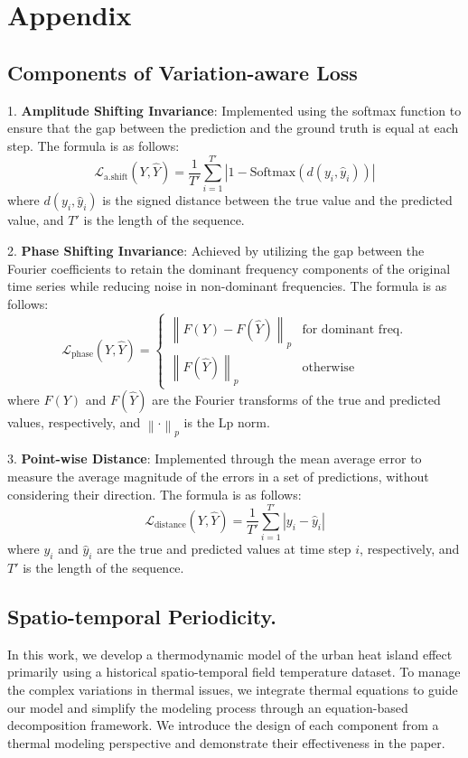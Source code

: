 \appendix 
\section{Appendix}
\label{sec:appendix}
\subsection{Components of Variation-aware Loss}
\label{app:loss}
1. \textbf{Amplitude Shifting Invariance}: Implemented using the softmax function to ensure that the gap between the prediction and the ground truth is equal at each step. The formula is as follows:
   \[
   \mathcal{L}_{\text{a.shift}}(Y, \hat{Y}) = \frac{1}{T'} \sum_{i=1}^{T'} \left| 1 - \text{Softmax}(d(y_i, \hat{y}_i)) \right|
   \]
   where \(d(y_i, \hat{y}_i)\) is the signed distance between the true value and the predicted value, and \(T'\) is the length of the sequence.

2. \textbf{Phase Shifting Invariance}: Achieved by utilizing the gap between the Fourier coefficients to retain the dominant frequency components of the original time series while reducing noise in non-dominant frequencies. The formula is as follows:
   \[
   \mathcal{L}_{\text{phase}}(Y, \hat{Y}) = \begin{cases} 
   \left\| F(Y) - F(\hat{Y}) \right\|_p & \text{for dominant freq.} \\
   \left\| F(\hat{Y}) \right\|_p & \text{otherwise}
   \end{cases}
   \]
   where \(F(Y)\) and \(F(\hat{Y})\) are the Fourier transforms of the true and predicted values, respectively, and \(\left\| \cdot \right\|_p\) is the Lp norm.

3. \textbf{Point-wise Distance}: Implemented through the mean average error to measure the average magnitude of the errors in a set of predictions, without considering their direction. The formula is as follows:
   \[
   \mathcal{L}_{\text{distance}}(Y, \hat{Y}) = \frac{1}{T'} \sum_{i=1}^{T'} \left| y_i - \hat{y}_i \right|
   \]
   where \(y_i\) and \(\hat{y}_i\) are the true and predicted values at time step \(i\), respectively, and \(T'\) is the length of the sequence.



\subsection{Spatio-temporal Periodicity.}
In this work, we develop a thermodynamic model of the urban heat island effect primarily using a historical spatio-temporal field temperature dataset. To manage the complex variations in thermal issues, we integrate thermal equations to guide our model and simplify the modeling process through an equation-based decomposition framework. We introduce the design of each component from a thermal modeling perspective and demonstrate their effectiveness in the paper. 


